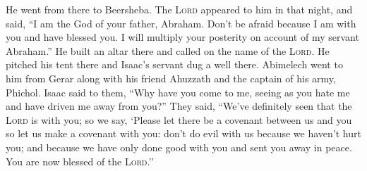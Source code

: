 \begin{inparaenum}
     He went from there to Beersheba.%
     The \textsc{Lord} appeared to him in that night, and said, ``I am the God of your father, Abraham. Don't be afraid because I am with you and have blessed you. I will multiply your posterity on account of my servant Abraham.''%
     He built an altar there and called on the name of the \textsc{Lord}. He pitched his tent there and Isaac's servant dug a well there.%
     Abimelech went to him from Gerar along with his friend Ahuzzath and the captain of his army, Phichol.%
     Isaac said to them, ``Why have you come to me, seeing as you hate me and have driven me away from you?''%
     They said, ``We've definitely seen that the \textsc{Lord} is with you; so we say, `Please let there be a covenant between us and you so let us make a covenant with you:%
     don't do evil with us because we haven't hurt you; and because we have only done good with you and sent you away in peace. You are now blessed of the \textsc{Lord}.''%
    
\end{inparaenum}
